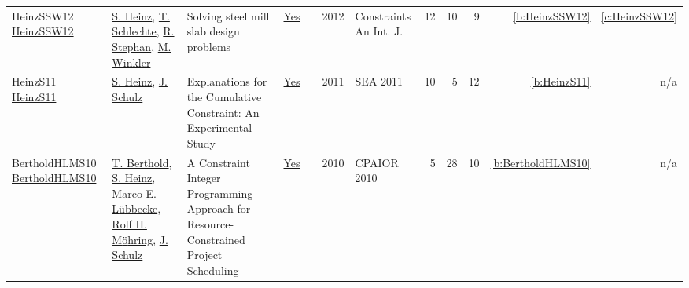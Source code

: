 {\begin{longtable}{>{\raggedright\arraybackslash}p{3cm}>{\raggedright\arraybackslash}p{6cm}>{\raggedright\arraybackslash}p{6.5cm}rrrp{2.5cm}rrrrr}
HeinzSSW12 \href{https://doi.org/10.1007/s10601-011-9113-8}{HeinzSSW12} & \hyperref[auth:a134]{S. Heinz}, \hyperref[auth:a140]{T. Schlechte}, \hyperref[auth:a141]{R. Stephan}, \hyperref[auth:a142]{M. Winkler} & Solving steel mill slab design problems & \href{../works/HeinzSSW12.pdf}{Yes} & \cite{HeinzSSW12} & 2012 & Constraints An Int. J. & 12 & 10 & 9 & \ref{b:HeinzSSW12} & \ref{c:HeinzSSW12}\\
HeinzS11 \href{https://doi.org/10.1007/978-3-642-20662-7_34}{HeinzS11} & \hyperref[auth:a134]{S. Heinz}, \hyperref[auth:a135]{J. Schulz} & Explanations for the Cumulative Constraint: An Experimental Study & \href{../works/HeinzS11.pdf}{Yes} & \cite{HeinzS11} & 2011 & SEA 2011 & 10 & 5 & 12 & \ref{b:HeinzS11} & n/a\\
BertholdHLMS10 \href{https://doi.org/10.1007/978-3-642-13520-0_34}{BertholdHLMS10} & \hyperref[auth:a354]{T. Berthold}, \hyperref[auth:a134]{S. Heinz}, \hyperref[auth:a355]{Marco E. L{\"{u}}bbecke}, \hyperref[auth:a356]{Rolf H. M{\"{o}}hring}, \hyperref[auth:a135]{J. Schulz} & A Constraint Integer Programming Approach for Resource-Constrained Project Scheduling & \href{../works/BertholdHLMS10.pdf}{Yes} & \cite{BertholdHLMS10} & 2010 & CPAIOR 2010 & 5 & 28 & 10 & \ref{b:BertholdHLMS10} & n/a\\
\end{longtable}
}

\clearpage
